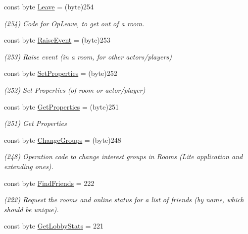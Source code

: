 \begin{DoxyCompactItemize}
const byte \hyperlink{class_exit_games_1_1_client_1_1_photon_1_1_operation_code_aa11e391e152516015f509f474f6ac7ce}{Leave} = (byte)254
\begin{DoxyCompactList}\small\item\em (254) Code for Op\+Leave, to get out of a room.\end{DoxyCompactList}\item 
const byte \hyperlink{class_exit_games_1_1_client_1_1_photon_1_1_operation_code_a629f95f520a21f28345366d84d9171bf}{Raise\+Event} = (byte)253
\begin{DoxyCompactList}\small\item\em (253) Raise event (in a room, for other actors/players)\end{DoxyCompactList}\item 
const byte \hyperlink{class_exit_games_1_1_client_1_1_photon_1_1_operation_code_a1e9bdcbf6be26d2157af2df0daaef988}{Set\+Properties} = (byte)252
\begin{DoxyCompactList}\small\item\em (252) Set Properties (of room or actor/player)\end{DoxyCompactList}\item 
const byte \hyperlink{class_exit_games_1_1_client_1_1_photon_1_1_operation_code_a7bfd447d57b228deb49cf59b9d442047}{Get\+Properties} = (byte)251
\begin{DoxyCompactList}\small\item\em (251) Get Properties\end{DoxyCompactList}\item 
const byte \hyperlink{class_exit_games_1_1_client_1_1_photon_1_1_operation_code_ab92f32ca36b9c62c35e2e32c067e6158}{Change\+Groups} = (byte)248
\begin{DoxyCompactList}\small\item\em (248) Operation code to change interest groups in Rooms (Lite application and extending ones).\end{DoxyCompactList}\item 
const byte \hyperlink{class_exit_games_1_1_client_1_1_photon_1_1_operation_code_a798a8291fd87aa865d470cd1f09f05b5}{Find\+Friends} = 222
\begin{DoxyCompactList}\small\item\em (222) Request the rooms and online status for a list of friends (by name, which should be unique).\end{DoxyCompactList}\item 
const byte \hyperlink{class_exit_games_1_1_client_1_1_photon_1_1_operation_code_ab495c557979c0d0bae83444712ce8acc}{Get\+Lobby\+Stats} = 221

\end{DoxyCompactItemize}
